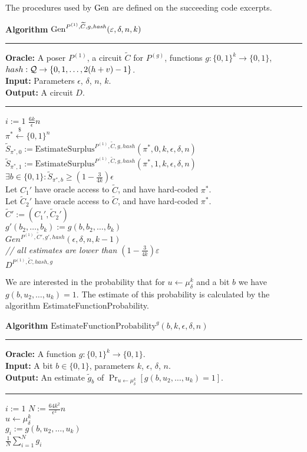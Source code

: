The procedures used by $\operatorname{\text{Gen}}$ are defined on the succeeding code excerpts.
\begin{codeblock}
  \textbf{Algorithm} $\operatorname{\text{Gen}}^{P^{(1)}, \widetilde{C}, g, \mathit{hash}}(\varepsilon, \delta, n, k)$
  \medskip \hrule
  \textbf{Oracle:} A poser $P^{(1)}$, a circuit $\widetilde{C}$ for $P^{(g)}$, functions $g: \{0,1\}^{k} \rightarrow \{0,1\}$, $hash:\mathcal{Q} \rightarrow \{0,1, \dots, 2(h + v) - 1\}$. \\
  \textbf{Input:}  Parameters $\epsilon$, $\delta$, $n$, $k$.\\
  \textbf{Output:} A circuit $D$.
  \medskip\hrule
  \For $i:=1$ \To $\frac{6k}{\epsilon}n$ \Do \\
  \IndI $\pi^* \xleftarrow{\$} \{0,1\}^{n}$\\
  \IndI $\widetilde{S}_{\pi^*,0} := \text{EstimateSurplus}^{P^{(1)},  \widetilde{C}, g, hash}(\pi^*, 0, k, \epsilon, \delta,n)$\\
  \IndI $\widetilde{S}_{\pi^*,1} := \text{EstimateSurplus}^{P^{(1)},  \widetilde{C}, g, hash}(\pi^*, 1, k, \epsilon, \delta,n)$\\
  \IndI \If $ \exists b \in \{0,1\}: \widetilde{S}_{\pi^*,b} \geq (1 - \frac{3}{4k}) \epsilon$ \Then \\
  \IndII Let $C_1'$ have oracle access to $\widetilde{C}$, and have hard-coded $\pi^*$. \\
  \IndII Let $\widetilde{C}_2'$ have oracle access to $\widetilde{C}$, and have hard-coded $\pi^*$. \\
  \IndII $\widetilde{C}' := (C_1', \widetilde{C}_2')$ \\
  \IndII $g'(b_2, \dots, b_k) := g(b, b_2, \dots, b_k)$\\
  \IndII\Return $Gen^{P^{(1)}, \widetilde{C}', g', hash}(\epsilon, \delta, n, k-1)$ \\
  \textit{// all estimates are lower than $(1-\frac{3}{4k})\varepsilon$}\\
  \Return $D^{P^{(1)}, \widetilde{C}, hash, g}$
\end{codeblock}
We are interested in the probability that for $u \leftarrow \mu_{\delta}^k$ and a bit $b$ we have $g(b,u_2, \dotsc, u_k) = 1$.
The estimate of this probability is calculated by the algorithm EstimateFunctionProbability.
%
\begin{codeblock}
  \textbf{Algorithm} $\text{EstimateFunctionProbability}^{g}(b, k, \epsilon, \delta, n)$
  \medskip\hrule
  \textbf{Oracle:} A function $g : \{0,1\}^{k} \rightarrow \{0,1\}$.\\
  \textbf{Input:} A bit $b \in \{0,1\}$, parameters $k$, $\epsilon$, $\delta$, $n$. \\
  \textbf{Output:} An estimate $\widetilde{g}_b$ of $\Pr_{u \leftarrow \mu_{\delta}^{k}}[g(b,u_2, \dotsc, u_k) = 1]$.
  \medskip\hrule
  \For $i:=1$ \To $N := \frac{64k^2}{\epsilon^2} n$ \Do \\
  \IndI $u \leftarrow \mu_{\delta}^{k}$ \\
  \IndI $g_i := g(b, u_2, \dotsc, u_k)$ \\
  \Return $\frac{1}{N} \sum_{i=1}^{N} g_i$
\end{codeblock}
